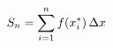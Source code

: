 \documentclass[preview]{standalone}
\begin{document}
\begin{align*}
\special{dvisvgm:raw <g id='unique000'>}S_n=\sum_{i=1}^{n}f(x_i^*)\,\Delta x\special{dvisvgm:raw </g>}
\end{align*}
\end{document}
